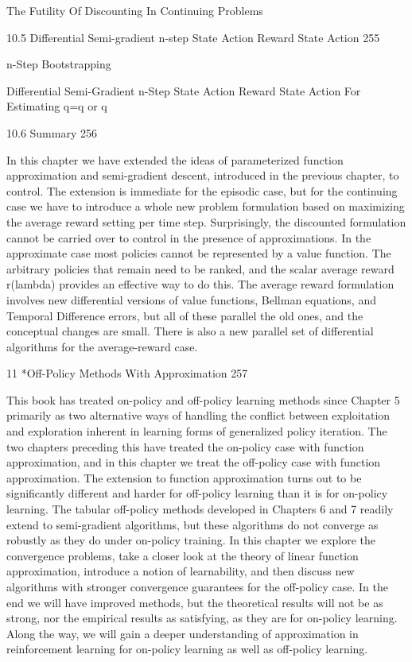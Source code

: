 The Futility Of Discounting In Continuing Problems

10.5 Differential Semi-gradient n-step State Action Reward State Action 255

n-Step Bootstrapping

Differential Semi-Gradient n-Step State Action Reward State Action For Estimating q=q or q

10.6 Summary 256

In this chapter we have extended the ideas of parameterized function approximation and semi-gradient descent, introduced in the previous chapter, to control. The extension is immediate for the episodic case, but for the continuing case we have to introduce a whole new problem formulation based on maximizing the average reward setting per time step. Surprisingly, the discounted formulation cannot be carried over to control in the presence of approximations. In the approximate case most policies cannot be represented by a value function. The arbitrary policies that remain need to be ranked, and the scalar average reward r(lambda) provides an effective way to do this. The average reward formulation involves new differential versions of value functions, Bellman equations, and Temporal Difference errors, but all of these parallel the old ones, and the conceptual changes are small. There is also a new parallel set of differential algorithms for the average-reward case.

11 *Off-Policy Methods With Approximation 257

This book has treated on-policy and off-policy learning methods since Chapter 5 primarily as two alternative ways of handling the conflict between exploitation and exploration inherent in learning forms of generalized policy iteration. The two chapters preceding this have treated the on-policy case with function approximation, and in this chapter we treat the off-policy case with function approximation. The extension to function approximation turns out to be significantly different and harder for off-policy learning than it is for on-policy learning. The tabular off-policy methods developed in Chapters 6 and 7 readily extend to semi-gradient algorithms, but these algorithms do not converge as robustly as they do under on-policy training. In this chapter we explore the convergence problems, take a closer look at the theory of linear function approximation, introduce a notion of learnability, and then discuss new algorithms with stronger convergence guarantees for the off-policy case. In the end we will have improved methods, but the theoretical results will not be as strong, nor the empirical results as satisfying, as they are for on-policy learning. Along the way, we will gain a deeper understanding of approximation in reinforcement learning for on-policy learning as well as off-policy learning.

